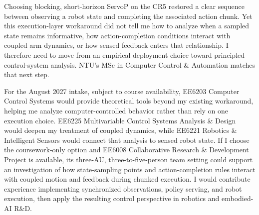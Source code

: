 Choosing blocking, short-horizon ServoP on the CR5 restored a clear sequence between observing a robot state and completing the associated action chunk. Yet this execution-layer workaround did not tell me how to analyze when a sampled state remains informative, how action-completion conditions interact with coupled arm dynamics, or how sensed feedback enters that relationship. I therefore need to move from an empirical deployment choice toward principled control-system analysis. NTU's MSc in Computer Control \& Automation matches that next step.

For the August 2027 intake, subject to course availability, EE6203 Computer Control Systems would provide theoretical tools beyond my existing workaround, helping me analyze computer-controlled behavior rather than rely on one execution choice. EE6225 Multivariable Control Systems Analysis \& Design would deepen my treatment of coupled dynamics, while EE6221 Robotics \& Intelligent Sensors would connect that analysis to sensed robot state. If I choose the coursework-only option and EE6008 Collaborative Research \& Development Project is available, its three-AU, three-to-five-person team setting could support an investigation of how state-sampling points and action-completion rules interact with coupled motion and feedback during chunked execution. I would contribute experience implementing synchronized observations, policy serving, and robot execution, then apply the resulting control perspective in robotics and embodied-AI R\&D.
